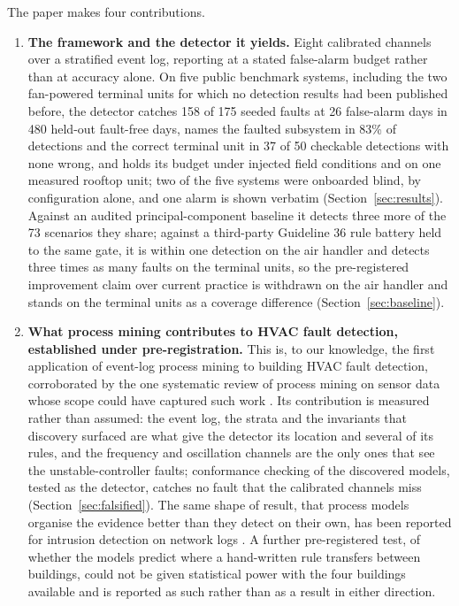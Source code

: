 \documentclass[11pt,letterpaper]{article}
\begin{document}
The paper makes four contributions.
\begin{enumerate}
\item \textbf{The framework and the detector it yields.} Eight calibrated channels over a stratified event log, reporting at a stated false-alarm budget rather than at accuracy alone. On five public benchmark systems, including the two fan-powered terminal units for which no detection results had been published before, the detector catches 158 of 175 seeded faults at 26 false-alarm days in 480 held-out fault-free days, names the faulted subsystem in 83\% of detections and the correct terminal unit in 37 of 50 checkable detections with none wrong, and holds its budget under injected field conditions and on one measured rooftop unit; two of the five systems were onboarded blind, by configuration alone, and one alarm is shown verbatim (Section~\ref{sec:results}). Against an audited principal-component baseline it detects three more of the 73 scenarios they share; against a third-party Guideline 36 rule battery held to the same gate, it is within one detection on the air handler and detects three times as many faults on the terminal units, so the pre-registered improvement claim over current practice is withdrawn on the air handler and stands on the terminal units as a coverage difference (Section~\ref{sec:baseline}).
\item \textbf{What process mining contributes to HVAC fault detection, established under pre-registration.} This is, to our knowledge, the first application of event-log process mining to building HVAC fault detection, corroborated by the one systematic review of process mining on sensor data whose scope could have captured such work \cite{brzychczy2025pmsensorreview}. Its contribution is measured rather than assumed: the event log, the strata and the invariants that discovery surfaced are what give the detector its location and several of its rules, and the frequency and oscillation channels are the only ones that see the unstable-controller faults; conformance checking of the discovered models, tested as the detector, catches no fault that the calibrated channels miss (Section~\ref{sec:falsified}). The same shape of result, that process models organise the evidence better than they detect on their own, has been reported for intrusion detection on network logs \cite{zhong2022pmids}. A further pre-registered test, of whether the models predict where a hand-written rule transfers between buildings, could not be given statistical power with the four buildings available and is reported as such rather than as a result in either direction.

\end{enumerate}
\end{document}

